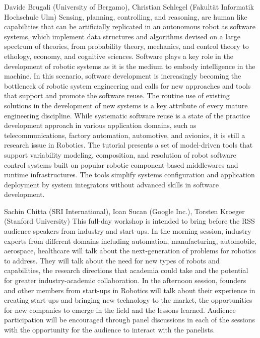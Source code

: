 \begin{spacing}{1.0}
{Davide Brugali (University of Bergamo), Christian Schlegel (Fakultät Informatik Hochschule Ulm)}
{
Sensing, planning, controlling, and reasoning, are human like capabilities that can be artificially replicated in an autonomous robot as software systems, which implement data structures and algorithms devised on a large spectrum of theories, from probability theory, mechanics, and control theory to ethology, economy, and cognitive sciences. Software plays a key role in the development of robotic systems as it is the medium to embody intelligence in the machine. In this scenario, software development is increasingly becoming the bottleneck of robotic system engineering and calls for new approaches and tools that support and promote the software reuse. The routine use of existing solutions in the development of new systems is a key attribute of every mature engineering discipline. While systematic software reuse is a state of the practice development approach in various application domains, such as telecommunications, factory automation, automotive, and avionics, it is still a research issue in Robotics. The tutorial presents a set of model-driven tools that support variability modeling, composition, and resolution of robot software control systems built on popular robotic component-based middlewares and runtime infrastructures. The tools simplify systems configuration and application deployment by system integrators without advanced skills in software development.
}



{Sachin Chitta (SRI International), Ioan Sucan (Google Inc.), Torsten Kroeger (Stanford University)}
{
This full-day workshop is intended to bring before the RSS audience speakers from industry and start-ups. In the morning session, industry experts from different domains including automation, manufacturing, automobile, aerospace, healthcare will talk about the next-generation of problems for robotics to address. They will talk about the need for new types of robots and capabilities, the research directions that academia could take and the potential for greater industry-academic collaboration. In the afternoon session, founders and other members from start-ups in Robotics will talk about their experience in creating start-ups and bringing new technology to the market, the opportunities for new companies to emerge in the field and the lessons learned. Audience participation will be encouraged through panel discussions in each of the sessions with the opportunity for the audience to interact with the panelists.
}



\end{spacing}
